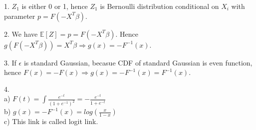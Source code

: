 \documentclass[10pt]{article}
\newenvironment{problem}[2][Problem]{\begin{trivlist}
\item[\hskip \labelsep {\bfseries #1}\hskip \labelsep {\bfseries #2.}]}{\end{trivlist}}
\begin{document}
\begin{problem}{3}
\item 1. $Z_{1}$ is either 0 or 1, hence $Z_{1}$ is Bernoulli distribution conditional on $X_{i}$ with parameter $p=F(-X^{T}\beta)$.
\item 2. We have $\mathbb{E}[Z]=p=F(-X^{T}\beta)$. Hence $g(F(-X^{T}\beta)) = X^{T}\beta \Rightarrow g(x)=-F^{-1}(x)$.
\item 3. If $\epsilon$ is standard Gaussian, becasue CDF of standard Gaussian is even function, hence $F(x)=-F(x) \Rightarrow g(x)=-F^{-1}(x)=F^{-1}(x)$. 
\item 4. \\
a) $F(t)= \int \frac{e^{-t}}{(1+e^{-1})^2} = -\frac{e^{-t}}{1+e^{-t}}$\\
b) $g(x)= -F^{-1}(x)=log(\frac{x}{1-x})$\\
c) This link is called logit link.




\end{problem}
\end{document}
